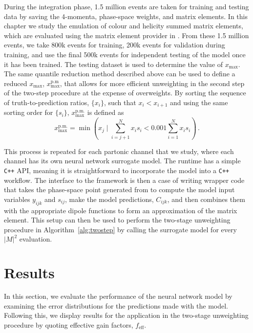 \documentclass[main.tex]{subfiles}
\begin{document}
During the integration phase, 1.5 million events are taken for training
and testing data by saving the 4-momenta, phase-space weights, and matrix
elements. In this chapter we study the emulation of colour and helicity
summed matrix elements, which are evaluated using the {\Amegic} matrix
element provider in {\Sherpa}. From these 1.5 million events, we take 800k events for
training, 200k events for validation during training, and use the final 500k events
for independent testing of the model once it has been trained. The testing
dataset is used to determine the value of $x_{\mathrm{max}}$.
The same quantile reduction method described above can be used to define
a reduced $x_{\mathrm{max}}$, $x_{\mathrm{max}}^{\mathrm{p.m}}$, that allows
for more efficient unweighting in the second step of the two-step procedure
at the expense of overweights.
By sorting the sequence of truth-to-prediction ratios, $\{x_{i}\}$, such that
$x_{i} < x_{i+1}$ and using the same sorting order for $\{s_{i}\}$,
$x_{\mathrm{max}}^{\mathrm{p.m.}}$ is defined as
\begin{equation}
    x_{\mathrm{max}}^{\mathrm{p.m.}} = \min\left(x_{j} \; \Bigg| \; \sum_{i=j+1}^{N} x_{i}s_{i} < 0.001 \sum_{i=1}^{N} x_{i}s_{i} \right) \, .
    \label{eq:x_max}
\end{equation}

This process is repeated for each partonic channel that we study, where each channel
has its own neural network surrogate model.
The {\ONNX} runtime has a simple \texttt{C++} API, meaning it is straightforward to
incorporate the model into a \texttt{C++} workflow. The interface to the {\Sherpa} framework
is then a case of writing wrapper code that takes the phase-space point generated from
{\Sherpa} to compute the model input variables $y_{ijk}$ and $s_{ij}$, make the model
predictions, $C_{ijk}$, and then combines them with the appropriate dipole
functions to form an approximation of the matrix element. This setup can then be
used to perform the two-stage unweighting procedure in Algorithm~\ref{alg:twostep} by calling the
surrogate model for every $|M|^{2}$ evaluation.

\section{Results}\label{sec:pp_results}
In this section, we evaluate the performance of the neural network model by
examining the error distributions for the predictions made with the model.
Following this, we display results for the application in the two-stage
unweighting procedure by quoting effective gain factors, $f_{\mathrm{eff}}$.
\end{document}
